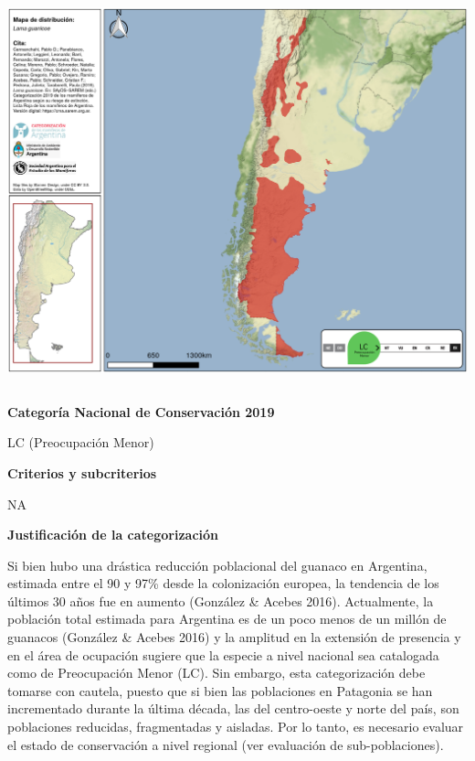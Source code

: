 \documentclass[
  x11names]{article}
\begin{document}
\includegraphics[width=1\linewidth]{maps/Cetartiodactyla/Lama_guanicoe}

%
\begin{table}[H]
\centering
\begin{tabular}[t]{>{\raggedright\arraybackslash}m{16cm}>{}m{16cm}}
\toprule
\cellcolor{ceil}{\textcolor{white}{\textbf{\rule{0pt}{14pt}CATEGORÍAS DE CONSERVACIÓN}}}\\
\bottomrule
\end{tabular}
\end{table}

\vspace{-0.4cm}

\textbf{Categoría Nacional de Conservación 2019}

LC (Preocupación Menor)

\textbf{Criterios y subcriterios}

NA

\textbf{Justificación de la categorización}

Si bien hubo una drástica reducción poblacional del guanaco en
Argentina, estimada entre el 90 y 97\% desde la colonización europea, la
tendencia de los últimos 30 años fue en aumento (González \& Acebes
2016). Actualmente, la población total estimada para Argentina es de un
poco menos de un millón de guanacos (González \& Acebes 2016) y la
amplitud en la extensión de presencia y en el área de ocupación sugiere
que la especie a nivel nacional sea catalogada como de Preocupación
Menor (LC). Sin embargo, esta categorización debe tomarse con cautela,
puesto que si bien las poblaciones en Patagonia se han incrementado
durante la última década, las del centro-oeste y norte del país, son
poblaciones reducidas, fragmentadas y aisladas. Por lo tanto, es
necesario evaluar el estado de conservación a nivel regional (ver
evaluación de sub-poblaciones).
\end{document}
